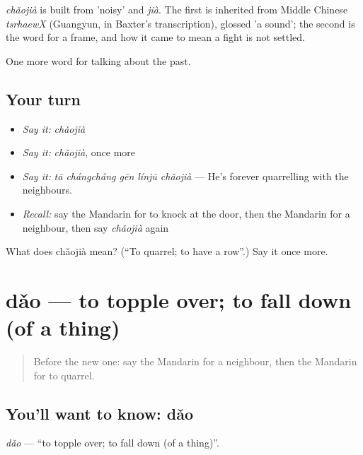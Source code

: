 \begin{cousinweb}
\emph{chǎojià} is built from  'noisy' and \emph{jià}. The first is inherited from Middle Chinese \emph{tsrhaewX} (Guangyun, in Baxter's transcription), glossed 'a sound'; the second is the word for a frame, and how it came to mean a fight is not settled.
\end{cousinweb}

\begin{grammarlens}[title={What you've built}]
One more word for talking about the past.
\end{grammarlens}

\subsection*{Your turn}
\begin{itemize}
\raggedright
  \item \emph{Say it:} \emph{chǎojià}
  \item \emph{Say it:} \emph{chǎojià}, once more
  \item \emph{Say it:} \emph{tā chángcháng gēn línjū chǎojià} — He's forever quarrelling with the neighbours.
  \item \emph{Recall:} say the Mandarin for to knock at the door, then the Mandarin for a neighbour, then say \emph{chǎojià} again
\end{itemize}

\begin{tcolorbox}[breakable,colback=teal!4,colframe=teal!35!black,title={Before you move on}]
What does chǎojià mean? (\textquotedblleft{}To quarrel; to have a row\textquotedblright{}.) Say it once more.
\end{tcolorbox}
\section[dǎo]{dǎo — to topple over; to fall down (of a thing)}

\label{lesson:ZH-C176-dao-topple}



\begin{quote}
Before the new one: say the Mandarin for a neighbour, then the Mandarin for to quarrel.
\end{quote}

\subsection*{You'll want to know: dǎo}
\emph{dǎo} — \textquotedblleft{}to topple over; to fall down (of a thing)\textquotedblright{}.

